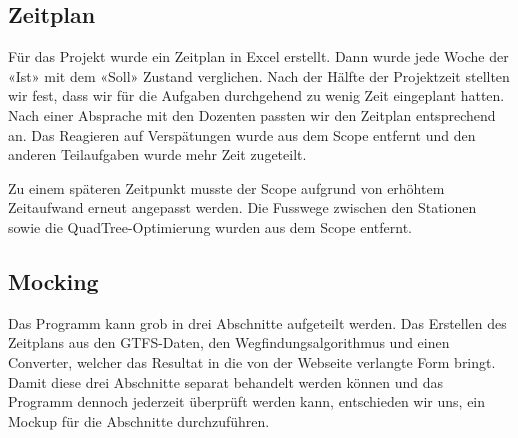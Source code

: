 \subsection{Zeitplan}
Für das Projekt wurde ein Zeitplan in Excel erstellt. Dann wurde jede Woche der «Ist» mit dem «Soll» Zustand verglichen. Nach der Hälfte der Projektzeit stellten wir fest, dass wir für die Aufgaben durchgehend zu wenig Zeit eingeplant hatten. Nach einer Absprache mit den Dozenten passten wir den Zeitplan entsprechend an. Das Reagieren auf Verspätungen wurde aus dem Scope entfernt und den anderen Teilaufgaben wurde mehr Zeit zugeteilt. \newline

Zu einem späteren Zeitpunkt musste der Scope aufgrund von erhöhtem Zeitaufwand erneut angepasst werden. Die Fusswege zwischen den Stationen sowie die QuadTree-Optimierung wurden aus dem Scope entfernt.

\subsection{Mocking}
Das Programm kann grob in drei Abschnitte aufgeteilt werden. Das Erstellen des Zeitplans aus den GTFS-Daten, den Wegfindungsalgorithmus und einen Converter, welcher das Resultat in die von der Webseite verlangte Form bringt. Damit diese drei Abschnitte separat behandelt werden können und das Programm dennoch jederzeit überprüft werden kann, entschieden wir uns, ein Mockup für die Abschnitte durchzuführen.


